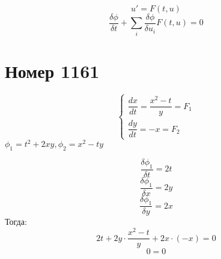 $$ u' = F(t, u) $$
$$ \dfrac{\delta \phi}{\delta t} + \sum_{i} \dfrac{\delta \phi}{\delta u_i} F(t, u) = 0 $$
\section*{Номер 1161}
$$ \begin{cases}
    \dfrac{dx}{dt} = \dfrac{x^2 - t}{y} = F_1 \\
    \dfrac{dy}{dt} = -x = F_2
\end{cases} $$
$\phi_1 = t^2 + 2xy, \phi_2 = x^2 - ty$\par
$$ \dfrac{\delta \phi_1}{\delta t} = 2t  $$
$$ \dfrac{\delta \phi_1}{\delta x} = 2y $$
$$ \dfrac{\delta \phi_1}{\delta y} = 2x $$
Тогда: 
$$ 2t + 2y \cdot \dfrac{x^2 - t}{y} + 2x \cdot (-x) = 0 $$
$$ 0 = 0 $$
